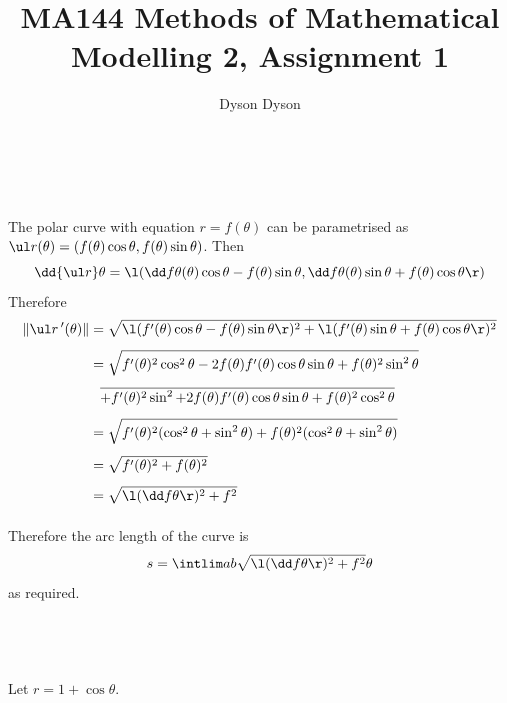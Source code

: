 \documentclass[a4paper]{article}
\title{MA144 Methods of Mathematical Modelling 2, Assignment 1}
\author{Dyson Dyson}
\date{}
\begin{document}
\maketitle

\setlength{\parindent}{0em}
\setlength{\parskip}{1em}


\subsection{~}

The polar curve with equation $r = f(\theta)$ can be parametrised as $\ul r (\theta) = (f(\theta) \cos \theta, f(\theta) \sin \theta)$. Then $$\dd{\ul r}\theta = \l(\dd f\theta (\theta) \cos \theta - f(\theta) \sin \theta, \dd f\theta (\theta) \sin \theta + f(\theta) \cos \theta\r)$$
Therefore \begin{align*}
\| \ul r\,'(\theta) \| &= \sqrt{\l( f'(\theta) \cos \theta - f(\theta) \sin \theta \r)^2 + \l( f'(\theta) \sin \theta + f(\theta) \cos \theta \r)^2}\\[1ex]
&= \sqrt{f'(\theta)^2 \cos^2 \theta - 2 f(\theta) f'(\theta) \cos\theta \sin\theta + f(\theta)^2 \sin^2 \theta}\\[1ex]
&\phantom{=} \overline{+ f'(\theta)^2 \sin^2 + 2 f(\theta) f'(\theta) \cos\theta \sin\theta + f(\theta)^2 \cos^2 \theta}\\[1ex]
&= \sqrt{f'(\theta)^2 (\cos^2 \theta + \sin^2 \theta) + f(\theta)^2 (\cos^2 \theta + \sin^2 \theta)}\\[1ex]
&= \sqrt{f'(\theta)^2 + f(\theta)^2}\\[1ex]
&= \sqrt{\l(\dd f\theta\r)^2 + f^2}\\[1ex]
\end{align*}

Therefore the arc length of the curve is $$s = \intlim ab {\sqrt{\l(\dd f\theta\r)^2 + f^2}}\theta$$ as required.

\subsection{~}

Let $r = 1 + \cos\theta$. %
\end{document}
